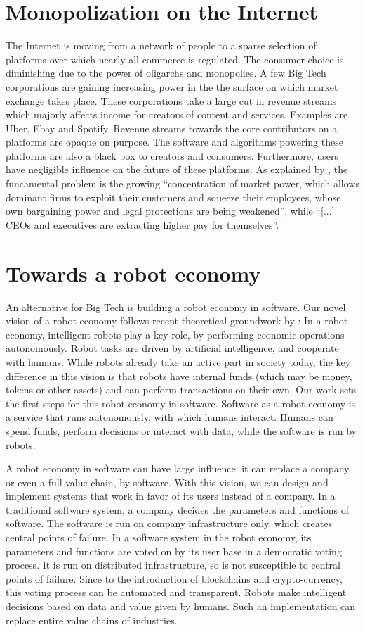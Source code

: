 \section{Monopolization on the Internet}
The Internet is moving from a network of people to a sparse selection of platforms over which nearly all commerce is regulated. The consumer choice is diminishing due to the power of oligarchs and monopolies. A few Big Tech corporations are gaining increasing power in the the surface on which market exchange takes place. These corporations take a large cut in revenue streams which majorly affects income for creators of content and services. Examples are Uber, Ebay and Spotify. Revenue streams towards the core contributors on a platforms are opaque on purpose. The software and algorithms powering these platforms are also a black box to creators and consumers. Furthermore, users have negligible influence on the future of these platforms. As explained by \citep{stiglitz2019market}, the funcamental problem is the growing ``concentration of market power, which allows dominant firms to exploit their customers and squeeze their employees, whose own bargaining power and legal protections are being weakened'', while ``[...] CEOs and executives are extracting higher pay for themselves''.

\section{Towards a robot economy}
An alternative for Big Tech is building a robot economy in software. Our novel vision of a robot economy follows recent theoretical groundwork by \cite{arduengo2020robot}: In a robot economy, intelligent robots play a key role, by performing economic operations autonomously. Robot tasks are driven by artificial intelligence, and cooperate with humans. While robots already take an active part in society today, the key difference in this vision is that robots have internal funds (which may be money, tokens or other assets) and can perform transactions on their own. Our work sets the first steps for this robot economy in software. Software as a robot economy is a service that runs autonomously, with which humans interact. Humans can spend funds, perform decisions or interact with data, while the software is run by robots.

A robot economy in software can have large influence: it can replace a company, or even a full value chain, by software. With this vision, we can design and implement systems that work in favor of its users instead of a company. In a traditional software system, a company decides the parameters and functions of software. The software is run on company infrastructure only, which creates central points of failure. In a software system in the robot economy, its parameters and functions are voted on by its user base in a democratic voting process. It is run on distributed infrastructure, so is not susceptible to central points of failure. Since to the introduction of blockchains and crypto-currency, this voting process can be automated and transparent. Robots make intelligent decisions based on data and value given by humans. Such an implementation can replace entire value chains of industries.

